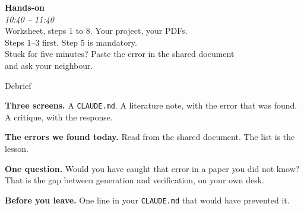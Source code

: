 \documentclass[svgnames,x11names,dvipsnames]{beamer}
\begin{document}

\begin{frame}[plain]
  \centering
  \vfill
  {\Huge \textbf{\textcolor{titleblue}{Hands-on}}}\\[0.4cm]
  {\Large \textit{10:40 -- 11:40}}\\[0.3cm]
  {\large Worksheet, steps 1 to 8. Your project, your PDFs.}\\[0.3cm]
  {\normalsize Steps 1--3 first. Step 5 is mandatory.}\\[0.4cm]
  {\small Stuck for five minutes? Paste the error in the shared document\\ and ask your neighbour.}
  \vfill
\end{frame}


\begin{frame}{Debrief}

\textbf{Three screens.} A \texttt{CLAUDE.md}. A literature note, with the error that was found. A critique, with the response.

\vspace{0.3cm}

\textbf{The errors we found today.} Read from the shared document. The list is the lesson.

\vspace{0.3cm}

\textbf{One question.} Would you have caught that error in a paper you did not know? That is the gap between generation and verification, on your own desk.

\vspace{0.3cm}

\textbf{Before you leave.} One line in your \texttt{CLAUDE.md} that would have prevented it.

\end{frame}
\end{document}
